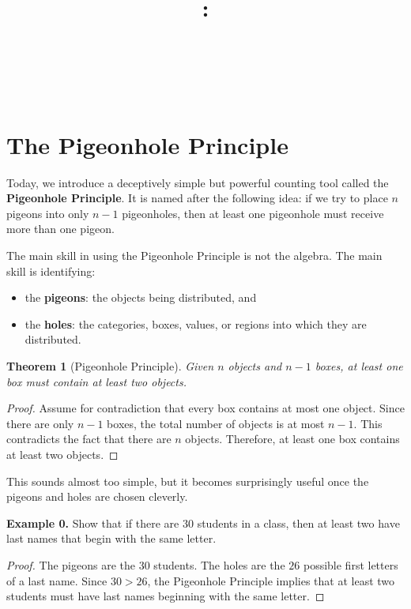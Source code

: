 \documentclass{article}
\title{
    \vspace{2in}
    \textbf{\lectClass:\\ \lectTitle}\\
    \vspace{0.1in}\large{\textit{\lectClassInstructor\ \lectSection}}\\
    \vspace{3in}
}
\author{\textbf{\lectAuthorName}}
\date{}
\newtheorem{theorem}{Theorem}
\begin{document}
\maketitle
\pagebreak

\section*{The Pigeonhole Principle}

Today, we introduce a deceptively simple but powerful counting tool called the \textbf{Pigeonhole Principle}. It is named after the following idea: if we try to place $n$ pigeons into only $n-1$ pigeonholes, then at least one pigeonhole must receive more than one pigeon.

\vspace{1.5mm}
The main skill in using the Pigeonhole Principle is not the algebra. The main skill is identifying:
\begin{itemize}
    \item the \textbf{pigeons}: the objects being distributed, and
    \item the \textbf{holes}: the categories, boxes, values, or regions into which they are distributed.
\end{itemize}

\begin{theorem}[Pigeonhole Principle]
Given $n$ objects and $n-1$ boxes, at least one box must contain at least two objects.
\end{theorem}

\begin{proof}
Assume for contradiction that every box contains at most one object. Since there are only $n-1$ boxes, the total number of objects is at most $n-1$. This contradicts the fact that there are $n$ objects. Therefore, at least one box contains at least two objects.
\end{proof}

This sounds almost too simple, but it becomes surprisingly useful once the pigeons and holes are chosen cleverly.

\vspace{2mm}
\noindent\textbf{Example 0.} Show that if there are $30$ students in a class, then at least two have last names that begin with the same letter.

\begin{proof}
The pigeons are the $30$ students. The holes are the $26$ possible first letters of a last name. Since $30>26$, the Pigeonhole Principle implies that at least two students must have last names beginning with the same letter.
\end{proof}
\end{document}
